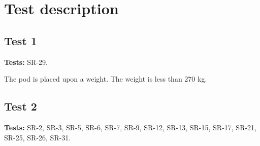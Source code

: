 \documentclass[Main]{subfiles}
\begin{document}
\chapter{Test description}

\section{Test 1}

\textbf{Tests: } SR-29.


\begin{TestCaseIntro}
\end{TestCaseIntro}

\begin{TestCase}
\TC
{The pod is placed upon a weight.}
{The weight is less than 270 kg.}

\end{TestCase}


\newpage
\section{Test 2}

\textbf{Tests:} SR-2, SR-3, SR-5, SR-6, SR-7, SR-9, SR-12, SR-13, SR-15, SR-17, SR-21, SR-25, SR-26, SR-31.

\vspace{-15pt}
\end{document}
